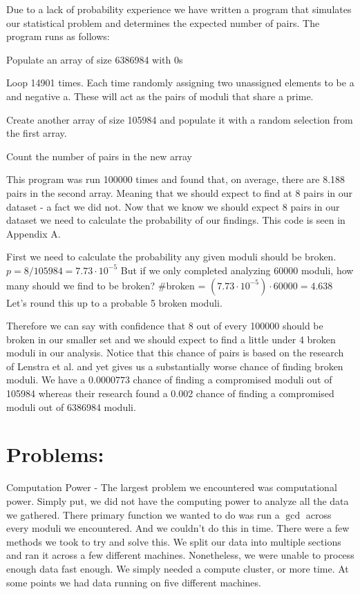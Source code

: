\documentclass[11pt,twoside]{article}
\begin{document}
\begin{multicols}{2}
Due to a lack of probability experience we have written a program that simulates
our statistical problem and determines the expected number of pairs. The program
runs as follows:
\begin{compactitem}
\item Populate an array of size 6386984 with 0s
\item Loop 14901 times. Each time randomly assigning two unassigned elements to
be a and negative a. These will act as the pairs of moduli that share a prime.
\item Create another array of size 105984 and populate it with a random 
selection from the first array.
\item Count the number of pairs in the new array
\end{compactitem}
This program was run 100000 times and found that, on average, there are 8.188
pairs in the second array. Meaning that we should expect to find at 8 pairs in
our dataset - a fact we did not. Now that we know we should expect 8 pairs in 
our dataset we need to calculate the probability of our findings. This code is
seen in Appendix A.

First we need to calculate the probability any given moduli should be broken.
$p = 8/105984= 7.73\cdot10^{-5}$ But if we only completed analyzing 60000
moduli, how many should we find to be broken? \#broken = $(7.73\cdot10^{-5})
\cdot60000 = 4.638$ Let's round this up to a probable 5 broken moduli. 

Therefore we can say with confidence that 8 out of every 100000 should be
broken in our smaller set and we should expect to find a little under 4 broken
moduli in our analysis. Notice that this chance of pairs is based on the
research of Lenstra et al. and yet gives us a substantially worse chance of
finding broken moduli. We have a $0.0000773$ chance of finding a compromised
moduli out of 105984 whereas their research found a 0.002 chance of finding a
compromised moduli out of 6386984 moduli.

\section{Problems:}

Computation Power - The largest problem we encountered was computational power.
Simply put, we did not have the computing power to analyze all the data we
gathered. There primary function we wanted to do was run a $\gcd$ across
every moduli we encountered. And we couldn't do this in time. There were a few
methods we took to try and solve this. We split our data into multiple sections
and ran it across a few different machines. Nonetheless, we were unable to
process enough data fast enough. We simply needed a compute cluster, or more
time. At some points we had data running on five different machines.


\end{multicols}
\end{document}
